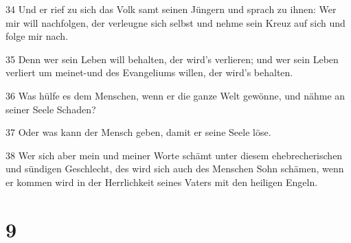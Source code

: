 \par 34 Und er rief zu sich das Volk samt seinen Jüngern und sprach zu ihnen: Wer mir will nachfolgen, der verleugne sich selbst und nehme sein Kreuz auf sich und folge mir nach.
\par 35 Denn wer sein Leben will behalten, der wird's verlieren; und wer sein Leben verliert um meinet-und des Evangeliums willen, der wird's behalten.
\par 36 Was hülfe es dem Menschen, wenn er die ganze Welt gewönne, und nähme an seiner Seele Schaden?
\par 37 Oder was kann der Mensch geben, damit er seine Seele löse.
\par 38 Wer sich aber mein und meiner Worte schämt unter diesem ehebrecherischen und sündigen Geschlecht, des wird sich auch des Menschen Sohn schämen, wenn er kommen wird in der Herrlichkeit seines Vaters mit den heiligen Engeln.

\chapter{9}

